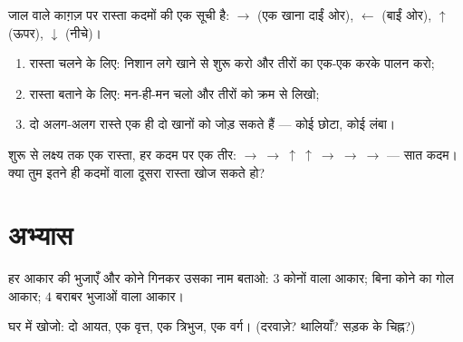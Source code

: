 \begin{method}[रास्ता बताना]\label{met:g1:shapes:path}
जाल वाले काग़ज़ पर रास्ता कदमों की एक सूची है:
$\to$ (एक खाना दाईं ओर), $\leftarrow$ (बाईं ओर), $\uparrow$ (ऊपर),
$\downarrow$ (नीचे)।
\begin{enumerate}
  \item रास्ता चलने के लिए: निशान लगे खाने से शुरू करो और तीरों
        का एक-एक करके पालन करो;
  \item रास्ता बताने के लिए: मन-ही-मन चलो और तीरों को क्रम से
        लिखो;
  \item दो अलग-अलग रास्ते एक ही दो खानों को जोड़ सकते हैं ---
        कोई छोटा, कोई लंबा।
\end{enumerate}
\end{method}

\begin{omfigure}

{\small शुरू से लक्ष्य तक एक रास्ता, हर कदम पर एक तीर:
$\to\ \to\ \uparrow\ \uparrow\ \to\ \to\ \to$ --- सात कदम। क्या
तुम इतने ही कदमों वाला दूसरा रास्ता खोज सकते हो?}
\end{omfigure}

\section{अभ्यास}

\begin{exercise}[$\star$]\label{exo:g1:shapes:1}
हर आकार की भुजाएँ और कोने गिनकर उसका नाम बताओ: $3$ कोनों वाला
आकार; बिना कोने का गोल आकार; $4$ बराबर भुजाओं वाला
आकार।
\end{exercise}

\begin{exercise}[$\star$]\label{exo:g1:shapes:2}
घर में खोजो: दो आयत, एक वृत्त, एक त्रिभुज, एक वर्ग।
(दरवाज़े? थालियाँ? सड़क के चिह्न?)
\end{exercise}

